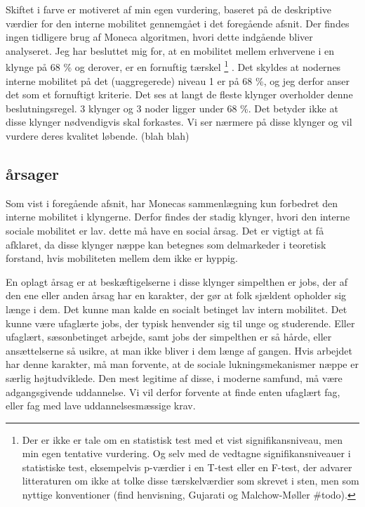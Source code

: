 Skiftet i farve er motiveret af min egen vurdering, baseret på de deskriptive værdier for den interne mobilitet gennemgået i det foregående afsnit. Der findes ingen tidligere brug af Moneca algoritmen, hvori dette indgående bliver analyseret. Jeg har besluttet mig for, at en mobilitet mellem erhvervene i en klynge på 68 \% og derover, er en fornuftig tærskel%
%
\footnote{Der er ikke er tale om en statistisk test med et vist signifikansniveau, men min egen tentative vurdering. Og selv med de vedtagne signifikansniveauer i statistiske test, eksempelvis p-værdier i en T-test eller en F-test,  der advarer litteraturen om ikke at tolke disse tærskelværdier som skrevet i sten, men som nyttige konventioner (find henvisning, Gujarati og Malchow-Møller \#todo). }%
%
. Det skyldes at nodernes interne mobilitet på det (uaggregerede) niveau 1 er på 68 \%, og jeg derfor anser det som et fornuftigt kriterie.
Det ses at langt de fleste klynger overholder denne beslutningsregel. 3 klynger og 3 noder ligger under 68 \%. Det betyder ikke at disse klynger nødvendigvis skal forkastes. Vi ser nærmere på disse klynger og vil vurdere deres kvalitet løbende. (blah blah)

%
\subsection{årsager \label{blha}}
%

Som vist i foregående afsnit, har Monecas sammenlægning kun forbedret den interne mobilitet i klyngerne. Derfor findes der stadig klynger, hvori den interne sociale mobilitet er lav. dette må have en social årsag. Det er vigtigt at få afklaret, da disse klynger næppe kan betegnes som delmarkeder i teoretisk forstand, hvis mobiliteten mellem dem ikke er hyppig.  

En oplagt årsag er at beskæftigelserne i disse klynger simpelthen er jobs, der af den ene eller anden årsag har en karakter, der gør at folk sjældent opholder sig længe i dem. Det kunne man kalde en socialt betinget lav intern mobilitet. Det kunne være ufaglærte jobs, der typisk henvender sig til unge og studerende. Eller ufaglært, sæsonbetinget arbejde, samt jobs der simpelthen er så hårde, eller ansættelserne så usikre, at man ikke bliver i dem længe af gangen. Hvis arbejdet har denne karakter, må man forvente, at de sociale lukningsmekanismer næppe er særlig højtudviklede. Den mest legitime af disse, i moderne samfund, må være adgangsgivende uddannelse. Vi vil derfor forvente at finde enten ufaglært fag, eller fag med lave uddannelsesmæssige krav.


